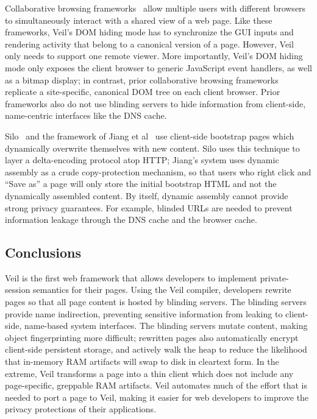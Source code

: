 Collaborative browsing frameworks~\cite{lowet09,jigsawCollab}
allow multiple users with different browsers to
simultaneously interact with a shared view of a web
page. Like these frameworks, Veil's DOM hiding mode
has to synchronize the GUI inputs and rendering activity
that belong to a canonical version of a page. However,
Veil only needs to support one remote viewer. More
importantly, Veil's DOM hiding mode only exposes the
client browser to generic JavaScript event handlers, as
well as a bitmap display; in contrast, prior collaborative
browsing frameworks replicate a site-specific, canonical
DOM tree on each client browser. Prior frameworks also
do not use blinding servers to hide information from
client-side, name-centric interfaces like the DNS
cache.

Silo~\cite{silo} and the framework of Jiang et
al~\cite{jiang14} use client-side bootstrap
pages which dynamically overwrite themselves
with new content. Silo uses this technique to
layer a delta-encoding protocol atop HTTP;
Jiang's system uses dynamic assembly as a crude
copy-protection mechanism, so that users who
right click and ``Save as'' a page will only
store the initial bootstrap HTML and not the
dynamically assembled content. By itself,
dynamic assembly cannot provide strong privacy
guarantees. For example, blinded URLs are needed
to prevent information leakage through the DNS
cache and the browser cache.

\subsection{Conclusions}
Veil is the first web framework that allows
developers to implement private-session semantics
for their pages. Using the Veil compiler,
developers rewrite pages so that all page content
is hosted by blinding servers. The blinding servers
provide name indirection, preventing sensitive
information from leaking to client-side, name-based
system interfaces. The blinding servers mutate
content, making object fingerprinting more
difficult; rewritten pages also automatically
encrypt client-side persistent storage, and
actively walk the heap to reduce the likelihood
that in-memory RAM artifacts will swap to disk in
cleartext form. In the extreme, Veil transforms
a page into a thin client which does not include
any page-specific, greppable RAM artifacts. Veil
automates much of the effort that is needed to
port a page to Veil, making it easier for
web developers to improve the privacy protections of
their applications.